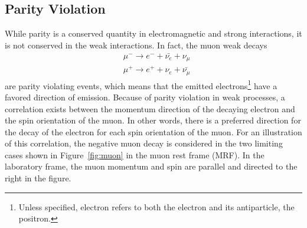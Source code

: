 \documentclass{outhesis}
\begin{document}

\subsection{Parity Violation}
\label{sec:pv}
While parity is a conserved quantity in electromagnetic and strong interactions, it is not conserved in the weak interactions. 
In fact, the muon weak decays
\begin{equation}
\begin{split}
&\mu^- \rightarrow {e^-} + \bar{\nu_e} + \nu_{\mu}\\
&\mu^+ \rightarrow {e^+} + \nu_e + \bar{\nu_{\mu}}
\label{eq:mu}
\end{split}
\end{equation}
are parity violating events, which means that the emitted electrons\footnote{Unless specified, electron refers to both the electron and its antiparticle, the positron.} have a favored direction of emission. 
Because of parity violation in weak processes, a correlation exists between the momentum direction of the decaying electron and the spin orientation of the muon. In other words, there is a preferred direction for the decay of the electron for each spin orientation of the muon. For an illustration of this correlation, the negative muon decay is considered in the two limiting cases shown in Figure~\ref{fig:muon} in the muon rest frame (MRF). In the laboratory frame, the muon momentum and spin are parallel and directed to the right in the figure. \\
\end{document}
